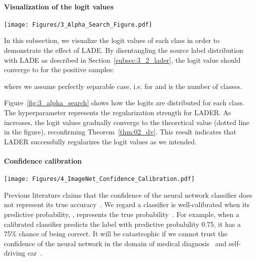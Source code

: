 \documentclass[final]{cvpr}
\begin{document}
\paragraph{Visualization of the logit values}
\begin{figure*}
\begin{center}
\texttt{[image: Figures/3\_Alpha\_Search\_Figure.pdf]}
\end{center}
\caption{
ResNet-32 model logits correspond to each class, where the model is trained on CIFAR-100-LT with an imbalance ratio of 100.
For each class , \textit{positive samples} denote the sample corresponds to class , and \textit{negative samples} denote the other.
The colored area denotes the variance of logit values, while the line indicates the mean.}
\label{fig:3_alpha_search}
\end{figure*} In this subsection, we visualize the logit values of each class in order to demonstrate the effect of LADE.
By disentangling the source label distribution with LADE as described in Section~\ref{subsec:3_2_lader}, the logit value  should converge to  for the positive samples:

where we assume perfectly separable case, i.e.  for  and  is the number of classes.

Figure~\ref{fig:3_alpha_search} shows how the logits are distributed for each class.
The hyperparameter  represents the regularization strength for LADER.
As  increases, the logit values gradually converge to the theoretical value  (dotted line in the figure), reconfirming Theorem~\ref{thm:02_dv}.
This result indicates that LADER successfully regularizes the logit values as we intended.

\paragraph{Confidence calibration}
\begin{figure*}
\begin{center}
\texttt{[image: Figures/4\_ImageNet\_Confidence\_Calibration.pdf]}
\end{center}
\caption{Reliability diagrams of ResNeXt-50-32x4d~\cite{xie2017aggregated} on ImageNet-LT.
The average confidence of the model trained by LADE nearly matches its accuracy.
}
\label{fig:4_confidence_calibration}
\end{figure*} Previous literature claims that the confidence of the neural network classifier does not represent its true accuracy~\cite{guo2017calibration}.
We regard a classifier is well-calibrated when its predictive probability, , represents the true probability~\cite{guo2017calibration}.
For example, when a calibrated classifier predicts the label  with predictive probability 0.75, it has a 75\% chance of being correct.
It will be catastrophic if we cannot trust the confidence of the neural network in the domain of medical diagnosis~\cite{caruana2015intelligible} and self-driving car~\cite{bojarski2016end}.
\end{document}
